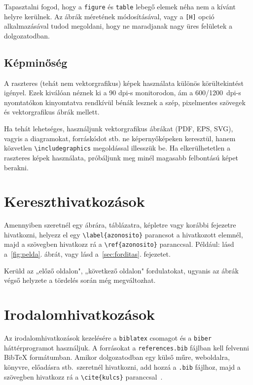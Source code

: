 Tapasztalni fogod, hogy a \texttt{figure} és \texttt{table} lebegő elemek
néha nem a kívánt helyre kerülnek. Az ábrák méretének módosításával, vagy a
\verb|[H]| opció alkalmazásával tudod megoldani, hogy ne maradjanak nagy üres
felületek a dolgozatodban.

\subsection{Képminőség}

A raszteres (tehát nem vektorgrafikus) képek használata különös
körültekintést igényel. Ezek kiválóan néznek ki a 90 dpi-s monitorodon, ám a
600/1200~dpi-s nyomtatókon kinyomtatva rendkívül bénák lesznek a szép,
pixelmentes szövegek és vektorgrafikus ábrák mellett.

Ha tehát lehetséges, használjunk vektorgrafikus ábrákat (PDF, EPS, SVG), vagyis
a diagramokat, forráskódot stb. ne képernyőképeken keresztül, hanem közvetlen
\verb|\includegraphics| megoldással illesszük be. Ha elkerülhetetlen a
raszteres képek használata, próbáljunk meg minél magasabb felbontású képet
berakni.

\section{Kereszthivatkozások}

Amennyiben szeretnél egy ábrára, táblázatra, képletre vagy korábbi fejezetre
hivatkozni, helyezz el egy \verb|\label{azonosito}| parancsot a hivatkozott
elemnél, majd a szövegben hivatkozz rá a \verb|\ref{azonosito}| paranccsal.
Például: lásd a~\ref{fig:pelda}. ábrát, vagy lásd a~\ref{sec:forditas}.
fejezetet.

Kerüld az „előző oldalon", „következő oldalon" fordulatokat, ugyanis az ábrák
végső helyzete a tördelés során még megváltozhat.

\section{Irodalomhivatkozások}
\label{sec:irodalom}

Az irodalomhivatkozások kezelésére a \texttt{biblatex} csomagot és a
\texttt{biber} háttérprogramot használjuk. A forrásokat a
\texttt{references.bib} fájlban kell felvenni BibTeX formátumban. Amikor
dolgozatodban egy külső műre, weboldalra, könyvre, előadásra stb.\ szeretnél
hivatkozni, add hozzá a \texttt{.bib} fájlhoz, majd a szövegben hivatkozz rá a
\verb|\cite{kulcs}| paranccsal~\cite{Abb00, Del03}.

